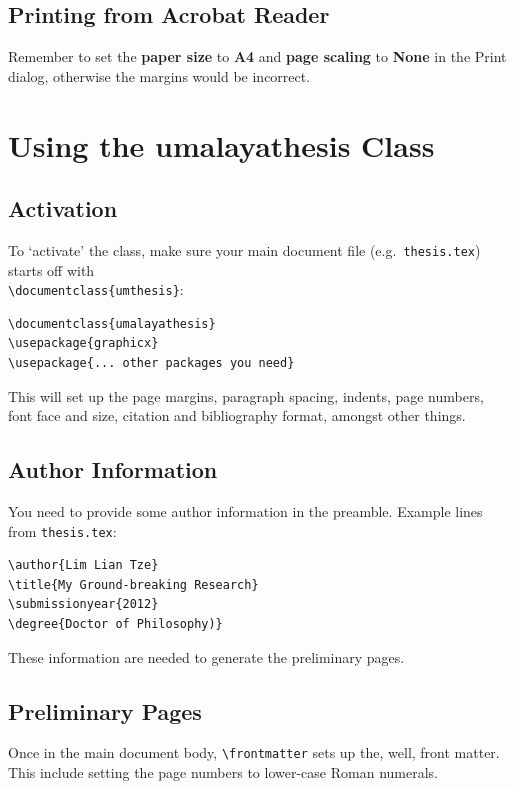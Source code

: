 \documentclass[a4paper,12pt]{scrartcl}
\begin{document}
\subsection{Printing from Acrobat Reader}
Remember to set the \textbf{paper size} to \textbf{A4} and \textbf{page scaling} to \textbf{None} in the \textsf{Print} dialog, otherwise the margins would be incorrect.

\section{Using the umalayathesis Class}\label{sec:howto}

\subsection{Activation}\label{sec:activation}
To `activate' the class, make sure your main document file (e.g.\ \texttt{thesis.tex}) starts off with\\\lstinline|\documentclass{umthesis}|:

\medskip%

\begin{lstlisting}
\documentclass{umalayathesis}
\usepackage{graphicx}
\usepackage{... other packages you need}
\end{lstlisting}

\medskip

This will set up the page margins, paragraph spacing, indents, page numbers, font face and size, citation and bibliography format, amongst other things. 

\subsection{Author Information}\label{sec:author:info}
You need to provide some author information in the preamble. Example lines from \texttt{thesis.tex}:

\medskip

\begin{lstlisting}[moretexcs={submissionyear,submissionmonth,faculty,degree,qualification}]
\author{Lim Lian Tze}
\title{My Ground-breaking Research}
\submissionyear{2012}
\degree{Doctor of Philosophy)}
\end{lstlisting}

\medskip

These information are needed to generate the preliminary pages.

\subsection{Preliminary Pages}\label{sec:prelim:pages}
Once in the main document body, \lstinline[moretexcs={frontmatter}]|\frontmatter| sets up the, well, front matter. This include setting the page numbers to lower-case Roman numerals.
\end{document}
